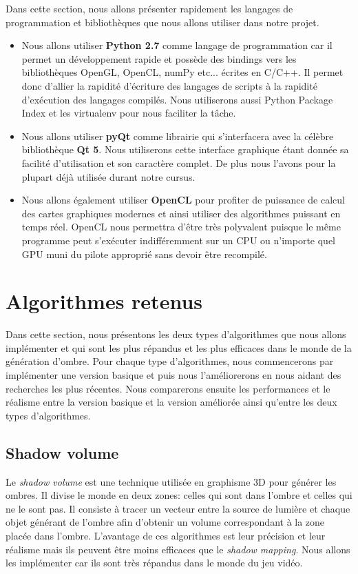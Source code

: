 \documentclass[a4paper,10pt]{report}
\begin{document}
Dans cette section, nous allons présenter rapidement les langages de programmation et bibliothèques que nous allons utiliser dans notre projet.

\begin{itemize}
\item{Nous allons utiliser \textbf{Python 2.7} comme langage de programmation car il permet un développement rapide et possède des bindings vers les bibliothèques OpenGL, OpenCL, numPy etc... écrites en C/C++. Il permet donc d'allier la rapidité d'écriture des langages de scripts à la rapidité d'exécution des langages compilés. Nous utiliserons aussi Python Package Index et les virtualenv pour nous faciliter la t\^ache.}
\item{Nous allons utiliser \textbf{pyQt} comme librairie qui s'interfacera avec la célèbre bibliothèque \textbf{Qt 5}. Nous utiliserons cette interface graphique étant donnée sa facilité d'utilisation et son caractère complet. De plus nous l'avons pour la plupart déjà utilisée durant notre cursus.}
\item{Nous allons également utiliser \textbf{OpenCL} pour profiter de puissance de calcul des cartes graphiques modernes et ainsi utiliser des algorithmes puissant en temps réel. OpenCL nous permettra d'être très polyvalent puisque le même programme peut s'exécuter indifféremment sur un CPU ou n'importe quel GPU muni du pilote approprié sans devoir être recompilé.}
\end{itemize}

\section{Algorithmes retenus}

Dans cette section, nous présentons les deux types d'algorithmes que nous allons implémenter et qui sont les plus répandus et les plus efficaces dans le monde de la génération d'ombre. Pour chaque type d'algorithmes, nous commencerons par implémenter une version basique et puis nous l'améliorerons en nous aidant des recherches les plus récentes.
Nous comparerons ensuite les performances et le réalisme entre la version basique et la version améliorée ainsi qu'entre les deux types d'algorithmes.

\subsection{Shadow volume}
Le \textit{shadow volume} est une technique utilisée en graphisme 3D pour générer les ombres. Il divise le monde en deux zones: celles qui sont dans l'ombre et celles qui ne le sont pas. Il consiste à tracer un vecteur entre la source de lumière et chaque objet générant de l'ombre afin d'obtenir un volume correspondant à la zone placée dans l'ombre.
L'avantage de ces algorithmes est leur précision et leur réalisme mais ils peuvent être moins efficaces que le \textit{shadow mapping}. Nous allons les implémenter car ils sont très répandus dans le monde du jeu vidéo.
\end{document}
